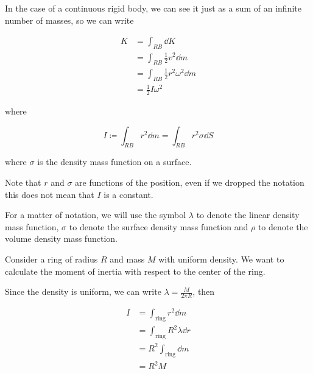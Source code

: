 \documentclass[14pt]{extarticle}
\begin{document}
In the case of a continuous rigid body, we can see it just as a sum of an infinite number of masses, so we can write

\begin{align}
    K & = \int_{RB} \dd{K}                          \\
      & = \int_{RB} \frac{1}{2} v^2 \dd{m}          \\
      & = \int_{RB} \frac{1}{2} r^2 \omega^2 \dd{m} \\
      & = \frac{1}{2} I \omega^2
\end{align}

where

\begin{equation}
    I \coloneq \int_{RB} r^2 \dd{m} = \int_{RB} r^2 \sigma \dd{S}
\end{equation}

where $\sigma$ is the density mass function on a surface.

Note that $r$ and $\sigma$ are functions of the position, even if we dropped the notation this does not mean that $I$ is a constant.

\begin{remark}
    For a matter of notation, we will use the symbol $\lambda$ to denote the linear density mass function, $\sigma$ to denote the surface density mass function and $\rho$ to denote the volume density mass function.
\end{remark}

\begin{example}
    Consider a ring of radius $R$ and mass $M$ with uniform density. We want to calculate the moment of inertia with respect to the center of the ring.

    Since the density is uniform, we can write $\lambda = \frac{M}{2\pi R}$, then

    \begin{align}
        I & = \int_{\text{ring}} r^2 \dd{m}         \\
          & = \int_{\text{ring}} R^2 \lambda \dd{r} \\
          & =  R^2 \int_{\text{ring}} \dd{m}        \\
          & = R^2 M
    \end{align}
\end{example}
\end{document}
